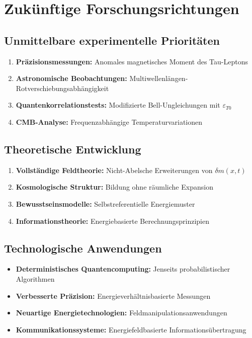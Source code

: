 \documentclass[12pt,a4paper]{report}
\begin{document}
	\section{Zukünftige Forschungsrichtungen}
	
	\subsection{Unmittelbare experimentelle Prioritäten}
	\begin{enumerate}
		\item \textbf{Präzisionsmessungen:} Anomales magnetisches Moment des Tau-Leptons
		\item \textbf{Astronomische Beobachtungen:} Multiwellenlängen-Rotverschiebungsabhängigkeit
		\item \textbf{Quantenkorrelationstests:} Modifizierte Bell-Ungleichungen mit $\varepsilon_{T0}$
		\item \textbf{CMB-Analyse:} Frequenzabhängige Temperaturvariationen
	\end{enumerate}
	
	\subsection{Theoretische Entwicklung}
	\begin{enumerate}
		\item \textbf{Vollständige Feldtheorie:} Nicht-Abelsche Erweiterungen von $\delta m(x,t)$
		\item \textbf{Kosmologische Struktur:} Bildung ohne räumliche Expansion
		\item \textbf{Bewusstseinsmodelle:} Selbstreferentielle Energiemuster
		\item \textbf{Informationstheorie:} Energiebasierte Berechnungsprinzipien
	\end{enumerate}
	
	\subsection{Technologische Anwendungen}
	\begin{itemize}
		\item \textbf{Deterministisches Quantencomputing:} Jenseits probabilistischer Algorithmen
		\item \textbf{Verbesserte Präzision:} Energieverhältnisbasierte Messungen
		\item \textbf{Neuartige Energietechnologien:} Feldmanipulationsanwendungen
		\item \textbf{Kommunikationssysteme:} Energiefeldbasierte Informationsübertragung
	\end{itemize}
	
\end{document}
